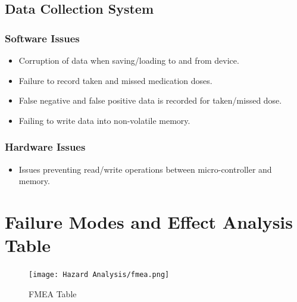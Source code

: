 \documentclass[12pt,titlepage]{article}
\begin{document}
\subsection{Data Collection System}
\subsubsection*{Software Issues}
\begin{itemize}
\item Corruption of data when saving/loading to and from device.
\item Failure to record taken and missed medication doses.
\item False negative and false positive data is recorded for taken/missed dose.
\item Failing to write data into non-volatile memory.
\end{itemize}
\subsubsection*{Hardware Issues}
\begin{itemize}
\item Issues preventing read/write operations between micro-controller and memory.
\end{itemize}

\pagebreak
\section{Failure Modes and Effect Analysis Table}


\begin{figure}[!htbp]
    \texttt{[image: Hazard Analysis/fmea.png]}
    \caption{FMEA Table}
    \label{fig:my_label}
\end{figure}
\end{document}
